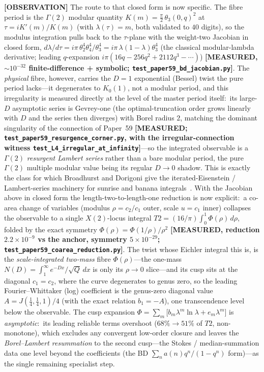 \documentclass[aps,pra,twocolumn,superscriptaddress,longbibliography]{revtex4-2}
\begin{document}
\textbf{[OBSERVATION]} The route to that closed form is now specific.  The fibre period
is the $\Gamma(2)$ modular quantity $K(m)=\tfrac{\pi}{2}\,\theta_{3}(0,q)^{2}$ at
$\tau=iK'(m)/K(m)$ (with $\lambda(\tau)=m$, both validated to $40$ digits), so the modulus
integration pulls back to the $\tau$-plane with the weight-two Jacobian in closed form,
$d\lambda/d\tau=i\pi\,\theta_{2}^{4}\theta_{4}^{4}/\theta_{3}^{4}
=i\pi\,\lambda(1-\lambda)\theta_{3}^{4}$ (the classical modular-lambda derivative; leading
$q$-expansion $i\pi(16q-256q^{2}+2112q^{3}-\cdots)$) \textbf{[MEASURED, $\sim\!10^{-32}$
finite-difference {\rm +} symbolic; \texttt{test\_paper59\_bd\_jacobian.py}]}.  The \emph{physical}
fibre, however, carries the
$D=1$ exponential (Bessel) twist the pure period lacks---it degenerates to $K_{0}(1)$, not a
modular period, and this irregularity is measured directly at the level of the master period
itself:\ its large-$D$ asymptotic series is Gevrey-one (the optimal-truncation order grows
linearly with $D$ and the series then diverges) with Borel radius $2$, matching the dominant
singularity of the connection of Paper~59 \textbf{[MEASURED;
\texttt{test\_paper59\_resurgence\_corner.py}, with the irregular-connection witness
\texttt{test\_L4\_irregular\_at\_infinity}]}---so the integrated observable is a $\Gamma(2)$
\emph{resurgent Lambert series}
rather than a bare modular period, the pure $\Gamma(2)$ multiple modular value being its regular
$D\to0$ shadow.  This is exactly the class for which Broadhurst and Dorigoni give the
iterated-Eisenstein / Lambert-series machinery for sunrise and banana
integrals~\cite{broadhurst_dorigoni2026}.  With the Jacobian above in closed form the
length-two-to-length-one reduction is now explicit:\ a co-area change of variables (modulus
$\rho=c_{2}/c_{1}$ outer, scale $u=c_{1}$ inner) collapses the observable to a single
$X(2)$-locus integral $T2=(16/\pi)\int_{0}^{1}\Phi(\rho)\,d\rho$, folded by the exact symmetry
$\Phi(\rho)=\Phi(1/\rho)/\rho^{2}$ \textbf{[MEASURED, reduction $2.2\times10^{-9}$ vs the anchor,
symmetry $5\times10^{-29}$; \texttt{test\_paper59\_coarea\_reduction.py}]}.  The twist whose
Eichler integral this is, is the \emph{scale-integrated two-mass} fibre $\Phi(\rho)$---the
one-mass $N(D)=\int_{1}^{\infty}e^{-Dx}/\sqrt{Q}\,dx$ is only its $\rho\to0$ slice---and its cusp
sits at the diagonal $c_{1}=c_{2}$, where the curve degenerates to genus zero, so the leading
Fourier--Whittaker (log) coefficient is the genus-zero diagonal value
$A=J(\tfrac14,\tfrac14,1)/4$ (with the exact relation $b_{1}=-A$), one transcendence level below
the observable.  The cusp expansion $\Phi=\sum_{m}\!\big[b_{m}\lambda^{m}\ln\lambda
+e_{m}\lambda^{m}\big]$ is \emph{asymptotic}:\ its leading reliable terms overshoot
($68\%\!\to\!51\%$ of $T2$, non-monotone), which excludes any convergent low-order closure and
leaves the \emph{Borel--Lambert resummation} to the second cusp---the Stokes / median-summation
data one level beyond the coefficients (the BD $\sum_{n}a(n)q^{n}/(1-q^{n})$ form)---as the single
remaining specialist step.
\end{document}
